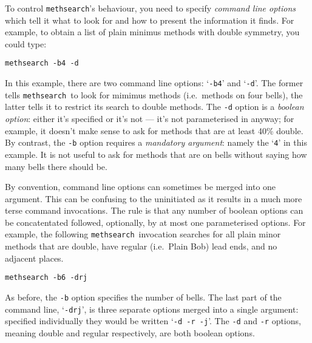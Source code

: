 \documentclass[a4paper,11pt,oneside]{book}
\makeatletter
\newcommand{\oi}[1]{\index{#1@{\hspace*{-\optwidth}\texttt{-}\texttt{#1}}}}
\newcommand{\symidx}[2]{} %
\def\methsearch{\texttt{meth\-search}}
\makeatother
\begin{document}
To control \methsearch's behaviour, you need to specify 
\textit{command line options}%
\symidx{-}{options}  which tell it what to look for and how to 
present the information it finds.  For example, to obtain a list of plain
minimus methods with double symmetry, you could type:%

\begin{Verbatim}
methsearch -b4 -d
\end{Verbatim}

In this example, there are two command line options: `\verb+-b4+' and 
`\verb+-d+'.  The former\oi{b} tells \methsearch\ to look for mimimus methods
(i.e.\ methods on four bells), the latter tells it to restrict its search
to double methods.\oi{d}  The \verb+-d+ option is a 
\textit{boolean option}: 
either it's specified or it's not --- it's not parameterised in anyway; 
for example, 
it doesn't make sense to ask for methods that are at least 40\% double.
By contrast, the \verb+-b+ option requires a 
\textit{mandatory argument}: 
namely the `\verb+4+' in this example.  It is not useful
to ask for methods that are on bells without saying how many bells there 
should be.

By convention, command line options can sometimes be merged into one 
argument.  This can be confusing to the uninitiated as it results in a much 
more terse command invocations.
The rule is that any number of boolean options can be concatentated
followed, optionally, by at most one parameterised options.  For example,
the following \methsearch\ invocation searches for all plain minor methods
that are double, have regular (i.e.\ Plain Bob) lead ends, 
and no adjacent places.

\begin{Verbatim}
methsearch -b6 -drj
\end{Verbatim}

As before, the \verb+-b+ option specifies the number of bells.  The last
part of the command line, `\verb+-drj+', is three separate options merged
into a single argument: specified individually they would be written 
`\verb+-d -r -j+'.  
The \verb+-d+\oi{d} and \verb+-r+\oi{r} options, meaning double and 
regular respectively, are both boolean options.  
\end{document}
